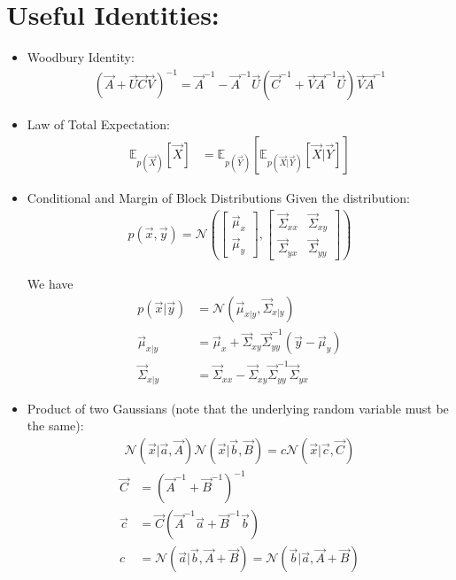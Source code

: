 \documentclass[12pt,twoside]{article}
\begin{document}
\section{Useful Identities:}

\begin{itemize}
\item Woodbury Identity:
	\begin{align*}
		(\vec{A} + \vec{U}\vec{C}\vec{V})^{-1} = \vec{A}^{-1}-\vec{A}^{-1} \vec{U}(\vec{C}^{-1}+\vec{V}\vec{A}^{-1}\vec{U})\vec{V}\vec{A}^{-1}
	\end{align*}

\item Law of Total Expectation:
	\begin{align*}
		\mathbb{E}_{p(\vec{X})}[\vec{X}] & =\mathbb{E}_{p(\vec{Y})}[\mathbb{E}_{p(\vec{X}\vert\vec{Y})}[\vec{X}\vert \vec{Y}]] 
	\end{align*}


\item Conditional and Margin of Block Distributions
Given the distribution:
\begin{align*}
	p(\vec{x},\vec{y}) = \mathcal{N}\left(
	\begin{bmatrix}
	\vec{\mu}_x\\
	\vec{\mu}_y
	\end{bmatrix},
	\begin{bmatrix}
	\vec{\Sigma}_{xx}	& \vec{\Sigma}_{xy}\\
	\vec{\Sigma}_{yx}	& \vec{\Sigma}_{yy}
	\end{bmatrix}
	\right)
\end{align*}

We have
\begin{align*}
	p(\vec{x}\vert \vec{y})
	& = \mathcal{N}\left(\vec{\mu}_{x\vert y}, \vec{\Sigma}_{x\vert y}\right)\\
	\vec{\mu}_{x\vert y}
	&=\vec{\mu}_x+ \vec{\Sigma}_{xy}\vec{\Sigma}_{yy}^{-1}(\vec {y} - \vec{\mu}_y)\\
	\vec{\Sigma}_{x\vert y}
	&=\vec{\Sigma}_{xx} - \vec{\Sigma}_{xy}\vec{\Sigma}_{yy}^{-1}\vec{\Sigma}_{yx}
\end{align*}

\item Product of two Gaussians (note that the underlying random variable must be the same):
	\begin{align*}
		\mathcal{N}(\vec{x}\vert \vec{a}, \vec{A})\mathcal{N}(\vec{x}\vert \vec{b}, \vec{B})= c\mathcal{N}(\vec{x}\vert \vec{c}, \vec{C})
	\end{align*}
	\begin{align*}
		\vec{C} &= (\vec{A}^{-1}+\vec{B}^{-1})^{-1}\\
		\vec{c} &= \vec{C}(\vec{A}^{-1}\vec{a}+\vec{B}^{-1}\vec{b})\\
		c& = \mathcal{N}(\vec{a}\vert \vec{b}, \vec{A} + \vec{B}) = \mathcal{N}(\vec{b}\vert \vec{a}, \vec{A} + \vec{B})
	\end{align*}


\end{itemize}
\end{document}
